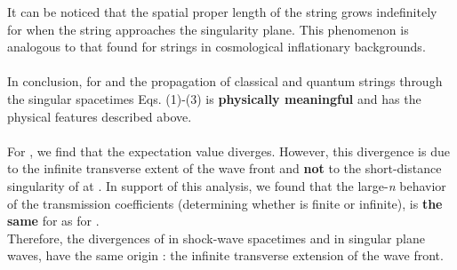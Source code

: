 \documentclass[12pt,a4paper]{article}
\begin{document}
It can be noticed that the spatial proper length of the string grows 
indefinitely for \coordHE{} when the string approaches the 
singularity plane. This phenomenon is analogous to that found for strings 
in cosmological inflationary backgrounds. \\ \\
In conclusion, for \coordHE{} and \coordHE{} the propagation of classical 
and quantum strings through the singular spacetimes Eqs. (1)-(3) is 
{\bf physically meaningful} and has the physical features described 
above.\\ \\ 
For \coordHE{}, we find that the 
expectation value \coordHE{} diverges. However, this divergence 
is due to the infinite transverse extent of the wave front and {\bf not} to 
the 
short-distance singularity of \coordHE{} at \coordHE{}. In support of this analysis, 
we found that the large-{\it n} behavior of the transmission coefficients 
(determining whether \coordHE{} is finite or infinite), is 
{\bf the 
same} for \coordHE{} as for \coordHE{}.\\ Therefore,  the 
divergences of \coordHE{} in shock-wave spacetimes and in 
singular plane waves, have the same origin : the infinite transverse extension 
of the wave front.
\end{document}
